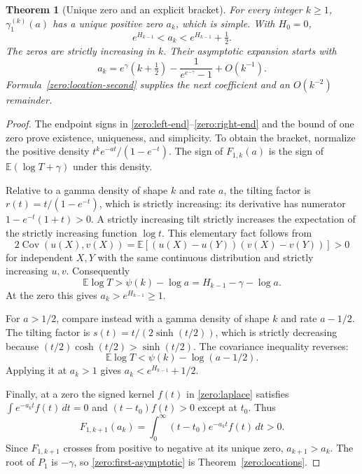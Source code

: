 \documentclass[11pt,a4paper]{article}
\newtheorem{theorem}{Theorem}[section]
\theoremstyle{definition}
\theoremstyle{remark}
\numberwithin{equation}{section}
\begin{document}
\begin{theorem}[Unique zero and an explicit bracket]\label{zero:first}
For every integer $k\geq1$, $\gamma_1^{(k)}(a)$ has a unique positive
zero $a_k$, which is simple.  With $H_0=0$,
\begin{equation}\label{zero:half-unit}
 e^{H_{k-1}}<a_k<e^{H_{k-1}}+\tfrac12.
\end{equation}
The zeros are strictly increasing in $k$.  Their asymptotic expansion
starts with
\begin{equation}\label{zero:first-asymptotic}
 a_k=e^\gamma\left(k+\tfrac12\right)
                     -\frac1{e^{e^{-\gamma}}-1}+O(k^{-1}).
\end{equation}
Formula~\eqref{zero:location-second} supplies the next coefficient
and an $O(k^{-2})$ remainder.
\end{theorem}
\begin{proof}
The endpoint signs in \eqref{zero:left-end}--\eqref{zero:right-end}
and the bound of one zero prove existence, uniqueness, and simplicity.
To obtain the bracket, normalize the positive density
$t^k e^{-at}/(1-e^{-t})$.  The sign of $F_{1,k}(a)$ is the sign of
$\mathbb E(\log T+\gamma)$ under this density.

Relative to a gamma density of shape $k$ and rate $a$, the tilting
factor is
$r(t)=t/(1-e^{-t})$, which is strictly increasing: its derivative has
numerator $1-e^{-t}(1+t)>0$.  A strictly increasing tilt strictly
increases the expectation of the strictly increasing function
$\log t$.  This elementary fact follows from
\[
 2\operatorname{Cov}(u(X),v(X))
   =\mathbb E[(u(X)-u(Y))(v(X)-v(Y))]>0
\]
for independent $X,Y$ with the same continuous distribution and
strictly increasing $u,v$.  Consequently
\[
 \mathbb E\log T>\psi(k)-\log a
                 =H_{k-1}-\gamma-\log a.
\]
At the zero this gives $a_k>e^{H_{k-1}}\geq1$.

For $a>1/2$, compare instead with a gamma density of shape $k$
and rate $a-1/2$.  The tilting factor is
$s(t)=t/(2\sinh(t/2))$, which is strictly decreasing because
$(t/2)\cosh(t/2)>\sinh(t/2)$.  The covariance inequality reverses:
\[
 \mathbb E\log T<\psi(k)-\log(a-1/2).
\]
Applying it at $a_k>1$ gives $a_k<e^{H_{k-1}}+1/2$.

Finally, at a zero the signed kernel $f(t)$ in
\eqref{zero:laplace} satisfies $\int e^{-a_kt}f(t)\,dt=0$ and
$(t-t_0)f(t)>0$ except at $t_0$.  Thus
\[
 F_{1,k+1}(a_k)=\int_0^\infty (t-t_0)e^{-a_kt}f(t)\,dt>0.
\]
Since $F_{1,k+1}$ crosses from positive to negative at its unique
zero, $a_{k+1}>a_k$.  The root of $P_1$ is $-\gamma$, so
\eqref{zero:first-asymptotic} is Theorem~\ref{zero:locations}.
\end{proof}
\end{document}
